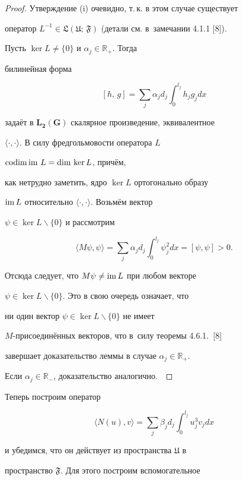 \begin{proof}

Утверждение (i) очевидно, т.\,к. в этом случае су\-щест\-ву\-ет

оператор $L^{-1}\in\mathbf{\mathfrak{L(U;\,F)}}$ (детали см. в~замечании 4.1.1 [8]).



Пусть $\ker L\neq \{0\}$ и $\alpha_j\in\mathbb{R}_+$. Тогда

билинейная форма

$$

[h,\,g]=\sum\limits_j\alpha_jd_j\int_0^{l_j}h_jg_jdx

$$

задаёт в $\mathbf{L_2(G)}$ скалярное произведение, эквивалентное

$\langle \cdot, \cdot\rangle$. В силу фред\-голь\-мо\-вос\-ти оператора $L$

${\rm codim} \, {\rm im} \ L={\rm dim} \, \ker L$, причём,

как нетрудно заметить, ядро $\ker L$ ортогонально образу

${\rm im \, }L$ относительно $\langle \cdot, \cdot\rangle$. Возьмём вектор

$\psi\in\ker L\backslash \{0\}$ и рассмотрим

$$

\langle M\psi, \psi\rangle=\sum\limits_j\alpha_jd_j\int_0^{l_j}\psi_j^2dx=[\psi, \psi]>0.

$$

Отсюда следует, что $M\psi\neq {\rm im \,}L$ при любом векторе

$\psi\in\ker L\backslash\{0\}$. Это в свою очередь означает, что

ни один вектор $\psi\in\ker L\backslash\{0\}$ не имеет

\mbox{$M$-присоединён}\-ных векторов, что в~силу теоремы 4.6.1.~[8]

завершает до\-ка\-за\-тель\-ство леммы в случае $\alpha_j\in\mathbb{R}_+$.

Если $\alpha_j\in\mathbb{R}_-$, доказательство аналогично.~\end{proof}



Теперь построим оператор

$$\langle N(u), v\rangle=\sum\limits_j\beta_jd_j\int_0^{l_j}u_j^3v_jdx$$

и убедимся, что он действует из пространства $\mathfrak{U}$ в

пространство $\mathfrak{F}$. Для этого построим вспомогательное

